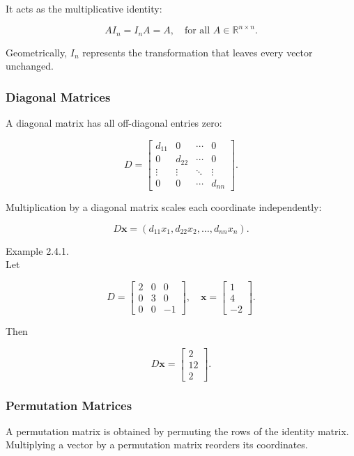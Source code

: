 \documentclass[
  12pt,
  a4paper,
]{article}
\begin{document}
It acts as the multiplicative identity:

\[AI_n = I_nA = A, \quad \text{for all } A \in \mathbb{R}^{n \times n}.\]

Geometrically, \(I_n\) represents the transformation that leaves every
vector unchanged.

\subsubsection{Diagonal Matrices}\label{diagonal-matrices}

A diagonal matrix has all off-diagonal entries zero:

\[D = \begin{bmatrix}
d_{11} & 0 & \cdots & 0 \\
0 & d_{22} & \cdots & 0 \\
\vdots & \vdots & \ddots & \vdots \\
0 & 0 & \cdots & d_{nn}
\end{bmatrix}.\]

Multiplication by a diagonal matrix scales each coordinate
independently:

\[D\mathbf{x} = (d_{11}x_1, d_{22}x_2, \dots, d_{nn}x_n).\]

Example 2.4.1.\\
Let

\[D = \begin{bmatrix} 2 & 0 & 0 \\ 0 & 3 & 0 \\ 0 & 0 & -1 \end{bmatrix}, \quad 
\mathbf{x} = \begin{bmatrix} 1 \\ 4 \\ -2 \end{bmatrix}.\]

Then

\[D\mathbf{x} = \begin{bmatrix} 2 \\ 12 \\ 2 \end{bmatrix}.\]

\subsubsection{Permutation Matrices}\label{permutation-matrices}

A permutation matrix is obtained by permuting the rows of the identity
matrix. Multiplying a vector by a permutation matrix reorders its
coordinates.
\end{document}
